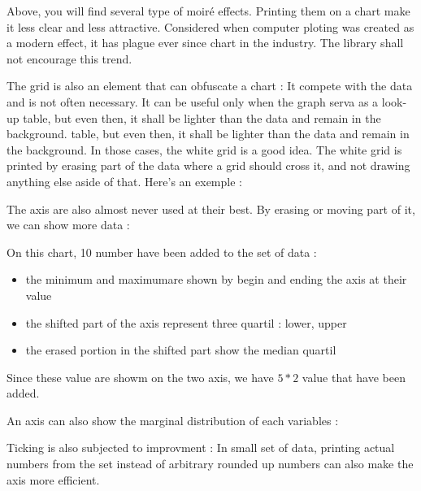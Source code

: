Above, you will find several type of moiré effects. Printing them on a chart make it less clear and less attractive. Considered when computer ploting was created as a modern effect, it has plague ever since chart in the industry. The library shall not encourage this trend.

The grid is also an element that can obfuscate a chart : It compete with the data and is not often necessary.
 It can be useful only when the graph serva as a look-up table, but even then, it shall be lighter than the data and remain in the background. table, but even then, it shall be lighter than the data and remain in the background.
 In those cases, the white grid is a good idea. The white grid is printed by erasing part of the data where a grid should cross it, and not drawing anything else aside of that. Here's an exemple :

The axis are also almost never used at their best. By erasing or moving part of it, we can show more data : 


On this chart, 10 number have been added to the set of data : 
\begin{itemize}
\item the minimum and maximumare shown by begin and ending the axis at their value
\item the shifted part of the axis represent three quartil : lower, upper
\item the erased portion in the shifted part show the median quartil
\end{itemize}
Since these value are showm on the two axis, we have $5*2$ value that have been added.

An axis can also show the marginal distribution of each variables :

Ticking is also subjected to improvment : In small set of data, printing actual numbers from the set instead of arbitrary rounded up numbers can also make the axis more efficient.

